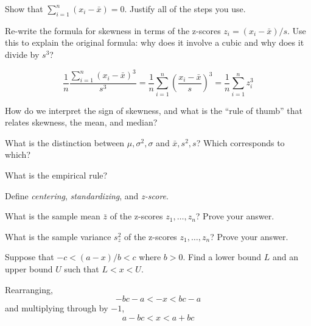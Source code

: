 \documentclass[addpoints,12pt]{exam}
\begin{document}
\begin{questions}

  \question Show that $\sum_{i=1}^n (x_i - \bar{x}) = 0$. Justify all of the steps you use.

  \question Re-write the formula for skewness in terms of the z-scores $z_i = (x_i - \bar{x})/s$. Use this to explain the original formula: why does it involve a cubic and why does it divide by $s^3$?
  \begin{solution}
    \[
      \frac{1}{n}\frac{\sum_{i=1}^n (x_i - \bar{x})^3}{s^3} = \frac{1}{n} \sum_{i=1}^n \left( \frac{x_i - \bar{x}}{s} \right)^3 = \frac{1}{n} \sum_{i=1}^n z_i^3
    \]
  \end{solution}


\question How do we interpret the sign of skewness, and what is the ``rule of thumb'' that relates skewness, the mean, and median?

\question What is the distinction between $\mu, \sigma^2, \sigma$ and $\bar{x}, s^2, s$? Which corresponds to which?

\question What is the empirical rule?

\question Define \emph{centering}, \emph{standardizing}, and \emph{z-score}.

\question What is the sample mean $\bar{z}$ of the z-scores $z_1, \dots, z_n$? Prove your answer.

\question What is the sample variance $s_z^2$ of the z-scores $z_1, \dots, z_n$? Prove your answer.

\question Suppose that $-c < (a - x)/b < c$ where $b>0$. Find a lower bound $L$ and an upper bound $U$ such that $L < x < U$.
			\begin{solution}
				Rearranging, 
					$$-bc - a < -x < bc - a$$
				and multiplying through by $-1$,
					$$a - bc < x <a + bc$$
        \end{solution}


\end{questions}
\end{document}
